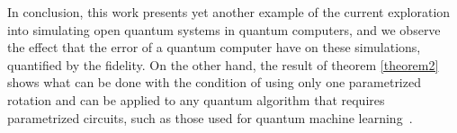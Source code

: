 \documentclass[10pt,letterpaper]{article} %
\begin{document}
In conclusion, this work presents yet another example of the current
exploration into simulating open quantum
systems in quantum computers,
and we observe the effect that the error of a quantum computer have
on these simulations, quantified by the fidelity. 
On the other hand, the result
of theorem \ref{theorem2}
shows what can be done with the condition of using only one
parametrized rotation and
can be applied to any quantum algorithm that requires parametrized circuits,
such as those used for quantum machine learning~\cite{Benedetti}.

%
%
% 
% 
\end{document}
